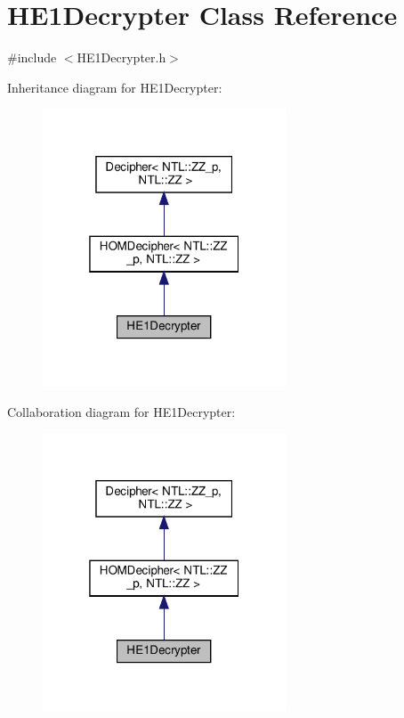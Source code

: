 \hypertarget{classHE1Decrypter}{}\section{H\+E1\+Decrypter Class Reference}
\label{classHE1Decrypter}


{\ttfamily \#include $<$H\+E1\+Decrypter.\+h$>$}



Inheritance diagram for H\+E1\+Decrypter\+:\nopagebreak
\begin{figure}[H]
\begin{center}
\leavevmode
\includegraphics[width=205pt]{classHE1Decrypter__inherit__graph}
\end{center}
\end{figure}


Collaboration diagram for H\+E1\+Decrypter\+:\nopagebreak
\begin{figure}[H]
\begin{center}
\leavevmode
\includegraphics[width=205pt]{classHE1Decrypter__coll__graph}
\end{center}
\end{figure}
